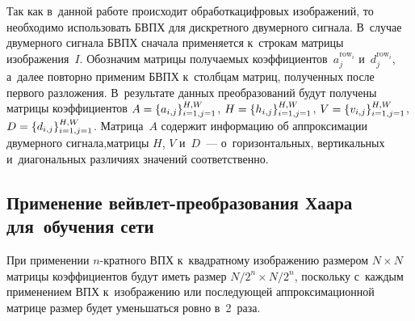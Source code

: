 \begin{multicols}{2}
Так как в~данной работе происходит обработка\linebreak цифровых изображений, то необходимо 
использовать БВПХ для дискретного двумерного сигнала. В~случае двумерного 
сигнала БВПХ \mbox{сначала} применяется к~строкам матрицы изображения~$I$. Обозначим 
матрицы получаемых коэффициентов~$a_j^{\mathrm{row}_i}$ и~$d_{j}^{\mathrm{row}_i}$, а~далее 
повторно применим БВПХ к~столбцам матриц, полученных после первого разложения. 
В~результате данных преобразований будут получены матрицы коэффициентов
$A \hm= \{a_{i,j}\}_{i=1, j=1}^{H, W}$, $H \hm= \{h_{i,j}\}_{i=1, j=1}^{H, W}$,
$V \hm= \{v_{i,j}\}_{i=1, j=1}^{H, W}$, $D \hm= \{d_{i,j}\}_{i=1, j=1}^{H, W}$. 
Матрица~$A$ содержит ин\-фор\-мацию об аппроксимации двумерного сигнала,\linebreak мат\-ри\-цы 
$H$, $V$ и~$D$~--- о~горизонтальных, вертикальных и~диагональных различиях 
значений со\-от\-вет\-ст\-венно.

\subsection{Применение вейвлет-преобразования Хаара для~обучения сети}

При применении $n$-кратного ВПХ к~квадратному изображению размером $N \times N$ 
матрицы коэффициентов будут иметь размер ${N}/2^{n} \times 
{N}/{2^{n}}$, \mbox{поскольку} с~каждым применением ВПХ к~изоб\-ра\-же\-нию или 
последующей аппроксимационной мат\-ри\-це размер будет уменьшаться ровно в~2~раза.\linebreak\vspace*{-12pt}

\pagebreak

\end{multicols}

\begin{figure*} %
\vspace*{1pt}
      \begin{center}
     \mbox{%
\epsfxsize=142.115mm 
}
\end{center}
\vspace*{-3pt}
    \label{fig:wpn_scheme}
    \vspace*{3pt}
\end{figure*}

